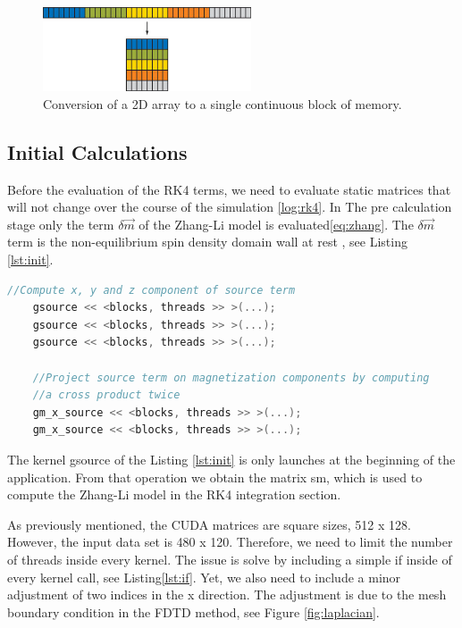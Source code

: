 \begin{figure}[htbp]
	\centering
		\includegraphics[width=0.55\textwidth]{Figures/flaten.png}
		\smallskip
	\caption[2D flatten array]{Conversion of a 2D array to a single continuous block of memory.}
	\label{fig:flaten}
\end{figure}


\subsection{Initial Calculations}

Before the evaluation of the RK4 terms, we need to evaluate static matrices that will not change over the course of the simulation \ref{log:rk4}. In The pre calculation stage only the term $ \delta \vec{m}$ of the Zhang-Li model is evaluated\ref{eq:zhang}. The $ \delta \vec{m}$ term is the non-equilibrium spin density domain wall at rest \cite{claudio}, see Listing \ref{lst:init}.

\begin{lstlisting}[language=C++, label={lst:init}, caption={Initial calculations.}]
	//Compute x, y and z component of source term
    gsource << <blocks, threads >> >(...);
    gsource << <blocks, threads >> >(...);
    gsource << <blocks, threads >> >(...);

    //Project source term on magnetization components by computing
    //a cross product twice
    gm_x_source << <blocks, threads >> >(...);
    gm_x_source << <blocks, threads >> >(...);
\end{lstlisting}

The kernel {\listf gsource} of the Listing \ref{lst:init} is only launches at the beginning of the application. From that operation we obtain the matrix {\listf sm}, which is used to compute the Zhang-Li model in the RK4 integration section.

As previously mentioned, the CUDA matrices are square sizes, 512 x 128. However, the input data set is 480 x 120. Therefore, we need to limit the number of threads inside every kernel. The issue is solve by including a simple {\listf if} inside of every kernel call, see Listing\ref{lst:if}. Yet, we also need to include a minor adjustment of two indices in the x direction. The adjustment is due to the mesh boundary condition in the FDTD method, see Figure \ref{fig:laplacian}.

